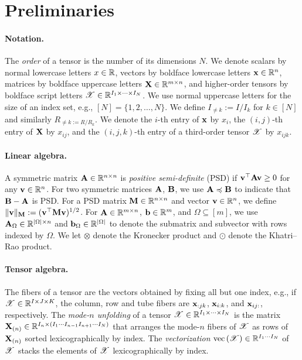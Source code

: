 \section{Preliminaries}
\label{sec:preliminaries}

\paragraph{Notation.}
The \emph{order} of a tensor is the number of its dimensions $N$.
We denote scalars by normal lowercase letters $x \in \mathbb{R}$,
vectors by boldface lowercase letters $\mathbf{x} \in \mathbb{R}^n$,
matrices by boldface uppercase letters $\mathbf{X} \in \mathbb{R}^{m \times n}$,
and higher-order tensors by boldface script letters $\bm{\mathscr{X}} \in \mathbb{R}^{I_1 \times \dots \times I_N}$.
We use normal uppercase letters for the size of an index set,
e.g., $[N] = \{1, 2, \dots, N\}$.
We define $I_{\neq k}:= I / I_k$ for $k\in [N]$ and similarly $R_{\neq k := R / R_k}$.
We denote the $i$-th entry of $\mathbf{x}$ by $x_i$,
the $(i,j)$-th entry of $\mathbf{X}$ by $x_{ij}$, and the
$(i,j,k)$-th entry of a third-order tensor $\bm{\mathscr{X}}$ by $x_{ijk}$.

\paragraph{Linear algebra.}
A symmetric matrix $\mathbf{A}\in \mathbb{R}^{n\times n}$ is \emph{positive semi-definite} (PSD) if $\mathbf{v}^\top \mathbf{A}\mathbf{v}\geq 0$ for any $\mathbf{v}\in\mathbb{R}^n$.
For two symmetric matrices $\mathbf{A}$, $\mathbf{B}$, we use $\mathbf{A} \preccurlyeq \mathbf{B}$ to indicate that $\mathbf{B}-\mathbf{A}$ is PSD.
For a PSD matrix $\mathbf{M}\in \mathbb{R}^{n\times n}$ and vector $\mathbf{v}\in \mathbb{R}^n$, we define $\lVert\mathbf{v}\rVert_{\mathbf{M}}:= (\mathbf{v}^\top \mathbf{M}\mathbf{v})^{1/2}$.
For $\mathbf{A}\in \mathbb{R}^{m\times n}$, $\mathbf{b}\in \mathbb{R}^m$, and $\Omega \subseteq [m]$, we use $\mathbf{A}_{\Omega}\in \mathbb{R}^{|\Omega|\times n}$ and $\mathbf{b}_{\Omega}\in\mathbb{R}^{|\Omega|}$ to denote the submatrix and subvector with rows indexed by $\Omega$.
We let $\otimes$ denote the Kronecker product and $\odot$ denote the Khatri--Rao product.

\paragraph{Tensor algebra.}
The fibers of a tensor are the vectors obtained by fixing all but one index,
e.g., if $\bm{\mathscr{X}} \in \mathbb{R}^{I \times J \times K}$,
the column, row and tube fibers are
$\mathbf{x}_{:jk}$, $\mathbf{x}_{i:k}$, and $\mathbf{x}_{ij:}$, respectively.
The \emph{mode-$n$ unfolding} of a
tensor $\bm{\mathscr{X}} \in \mathbb{R}^{I_1 \times \dots \times I_N}$ is the matrix
$\mathbf{X}_{(n)} \in \mathbb{R}^{I_n \times (I_1 \cdots I_{n-1} I_{n+1}\cdots I_N)}$
that arranges the mode-$n$ fibers of $\bm{\mathscr{X}}$ as rows of $\mathbf{X}_{(n)}$ sorted lexicographically by index. The \emph{vectorization} $\operatorname*{vec}{(\bm{\mathscr{X}})} \in \mathbb{R}^{I_1\cdots I_N}$ of $\bm{\mathscr{X}}$ stacks the elements of $\bm{\mathscr{X}}$ lexicographically by index.

